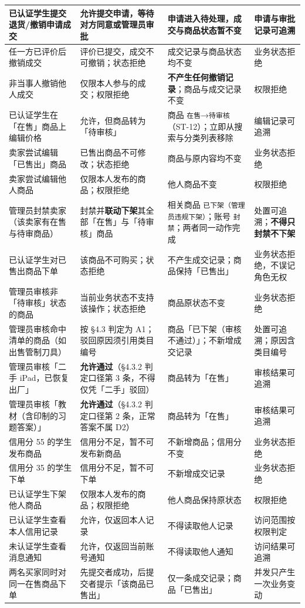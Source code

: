\documentclass[12pt,a4paper]{ctexart}
\begin{document}
{\begin{longtable}{|p{3.66cm}|p{4.50cm}|p{4.84cm}|p{3.01cm}|}
\hline
已认证学生提交退货/撤销申请成交 & \textbf{允许提交申请，等待对方同意或管理员审批} & 申请进入待处理，成交与商品状态暂不变 & 申请与审批记录可追溯 \\
\hline
任一方已评价后撤销成交 & 评价已提交，成交不可撤销；状态拒绝 & 成交记录与商品状态均不变 & 业务状态拒绝 \\
\hline
非当事人撤销他人成交 & 仅限本人参与的成交；权限拒绝 & \textbf{不产生任何撤销记录}；商品与成交记录不变 & 权限拒绝 \\
\hline
已认证学生在「在售」商品上编辑价格 & 允许，但商品转为「待审核」 & 商品 \texttt{在售}→\texttt{待审核}（ST-12）；立即从搜索与分类列表移除 & 编辑记录可追溯 \\
\hline
卖家尝试编辑「已售出」商品 & 已售出商品不可修改；状态拒绝 & 商品与原内容均不变 & 业务状态拒绝 \\
\hline
卖家尝试编辑他人商品 & 仅限本人发布的商品；权限拒绝 & 他人商品不变 & 权限拒绝 \\
\hline
管理员封禁卖家（该卖家有在售与待审商品） & 封禁并\textbf{联动下架}其全部「在售」与「待审核」商品 & 相关商品 \texttt{已下架（管理员违规下架）}；账号 \texttt{封禁}；两者同一动作完成 & 处置可追溯；\textbf{不得只封禁不下架} \\
\hline
已认证学生对已售出商品下单 & 该商品不可购买；状态拒绝 & 不产生成交记录；商品保持「已售出」 & 业务状态拒绝，不误记角色无权 \\
\hline
管理员审核非「待审核」状态的商品 & 当前业务状态不支持该操作；状态拒绝 & 商品原状态不变 & 业务状态拒绝 \\
\hline
管理员审核命中清单的商品（如出售管制刀具） & 按 §4.3 判定为 A1；驳回原因须引用类目编号 & 商品「已下架（审核不通过）」；不新增成交记录 & 处置可追溯；原因含类目编号 \\
\hline
管理员审核「二手 iPad，已恢复出厂」 & \textbf{允许通过}（§4.3.2 判定口径第 3 条，不得仅凭「二手」驳回） & 商品转为「在售」 & 审核结果可追溯 \\
\hline
管理员审核「教材（含印制的习题答案）」 & \textbf{允许通过}（§4.3.2 判定口径第 2 条，正常答案不属 D2） & 商品转为「在售」 & 审核结果可追溯 \\
\hline
信用分 55 的学生发布商品 & 信用分不足，暂不可发布新商品 & 不新增商品；信用分不变 & 业务状态拒绝 \\
\hline
信用分 35 的学生下单 & 信用分不足，暂不可下单 & 不新增成交记录 & 业务状态拒绝 \\
\hline
已认证学生下架他人商品 & 仅限本人发布的商品；权限拒绝 & 他人商品保持原状态 & 权限拒绝 \\
\hline
已认证学生查看本人信用记录 & 允许，仅返回本人记录 & 不得读取他人记录 & 访问范围按权限判定 \\
\hline
未认证学生查看消息通知 & 允许，仅返回当前账号通知 & 不得读取他人通知 & 访问结果可追溯 \\
\hline
两名买家同时对同一在售商品下单 & 先提交者成功，后提交者提示「该商品已售出」 & 仅一条成交记录；商品「已售出」 & 并发只产生一次业务变动 \\
\hline
\end{longtable}
}
\end{document}
